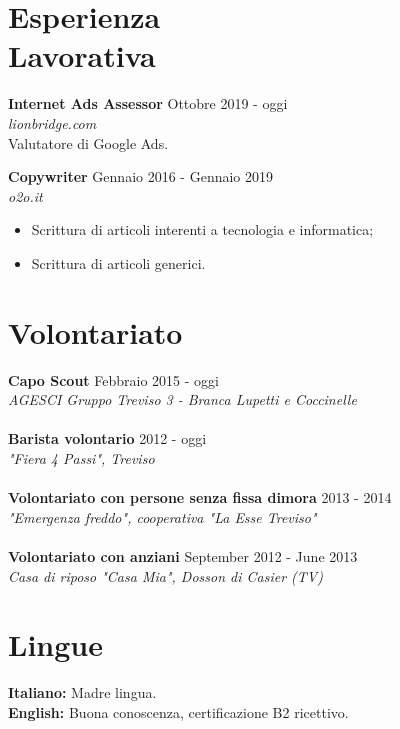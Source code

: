 \documentclass[margin, 10pt]{res}
\begin{document}
\begin{resume}
 
\section{Esperienza \\ Lavorativa}

\textbf{Internet Ads Assessor} \hfill Ottobre 2019 - oggi \\
\textit{lionbridge.com} \\
Valutatore di Google Ads.

\textbf{Copywriter} \hfill Gennaio 2016 - Gennaio 2019 \\
\textit{o2o.it}
\begin{itemize}
\item Scrittura di articoli interenti a tecnologia e informatica;
\item Scrittura di articoli generici.
\end{itemize} 



\section{Volontariato}

\textbf{Capo Scout} \hfill Febbraio 2015 - oggi \\
\textit{AGESCI Gruppo Treviso 3 - Branca Lupetti e Coccinelle} \\ \\
\textbf{Barista volontario} \hfill 2012 - oggi \\
\textit{"Fiera 4 Passi", Treviso} \\ \\
\textbf{Volontariato con persone senza fissa dimora} \hfill 2013 - 2014 \\
\textit{"Emergenza freddo", cooperativa "La Esse Treviso"} \\ \\
\textbf{Volontariato con anziani} \hfill September 2012 - June 2013 \\
\textit{Casa di riposo "Casa Mia", Dosson di Casier (TV)} 





\section{Lingue}
\textbf{Italiano: } Madre lingua. \\
\textbf{English: } Buona conoscenza, certificazione B2 ricettivo.\\

\end{resume}
\end{document}

